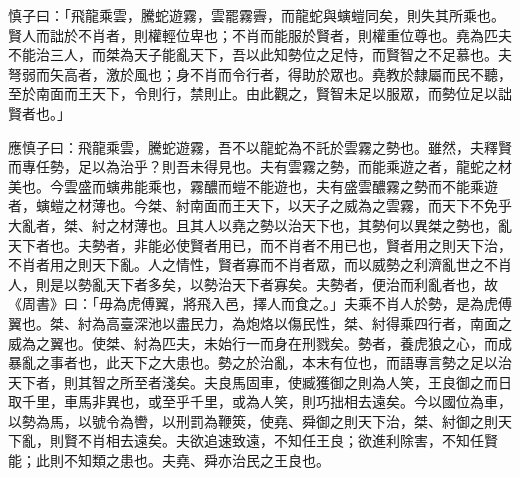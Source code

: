 
\begin{pinyinscope}
慎子曰：「飛龍乘雲，騰蛇遊霧，雲罷霧霽，而龍蛇與螾螘同矣，則失其所乘也。賢人而詘於不肖者，則權輕位卑也；不肖而能服於賢者，則權重位尊也。堯為匹夫不能治三人，而桀為天子能亂天下，吾以此知勢位之足恃，而賢智之不足慕也。夫弩弱而矢高者，激於風也；身不肖而令行者，得助於眾也。堯教於隸屬而民不聽，至於南面而王天下，令則行，禁則止。由此觀之，賢智未足以服眾，而勢位足以詘賢者也。」

應慎子曰：飛龍乘雲，騰蛇遊霧，吾不以龍蛇為不託於雲霧之勢也。雖然，夫釋賢而專任勢，足以為治乎？則吾未得見也。夫有雲霧之勢，而能乘遊之者，龍蛇之材美也。今雲盛而螾弗能乘也，霧醲而螘不能遊也，夫有盛雲醲霧之勢而不能乘遊者，螾螘之材薄也。今桀、紂南面而王天下，以天子之威為之雲霧，而天下不免乎大亂者，桀、紂之材薄也。且其人以堯之勢以治天下也，其勢何以異桀之勢也，亂天下者也。夫勢者，非能必使賢者用已，而不肖者不用已也，賢者用之則天下治，不肖者用之則天下亂。人之情性，賢者寡而不肖者眾，而以威勢之利濟亂世之不肖人，則是以勢亂天下者多矣，以勢治天下者寡矣。夫勢者，便治而利亂者也，故《周書》曰：「毋為虎傅翼，將飛入邑，擇人而食之。」夫乘不肖人於勢，是為虎傅翼也。桀、紂為高臺深池以盡民力，為炮烙以傷民性，桀、紂得乘四行者，南面之威為之翼也。使桀、紂為匹夫，未始行一而身在刑戮矣。勢者，養虎狼之心，而成暴亂之事者也，此天下之大患也。勢之於治亂，本末有位也，而語專言勢之足以治天下者，則其智之所至者淺矣。夫良馬固車，使臧獲御之則為人笑，王良御之而日取千里，車馬非異也，或至乎千里，或為人笑，則巧拙相去遠矣。今以國位為車，以勢為馬，以號令為轡，以刑罰為鞭筴，使堯、舜御之則天下治，桀、紂御之則天下亂，則賢不肖相去遠矣。夫欲追速致遠，不知任王良；欲進利除害，不知任賢能；此則不知類之患也。夫堯、舜亦治民之王良也。


\end{pinyinscope}
